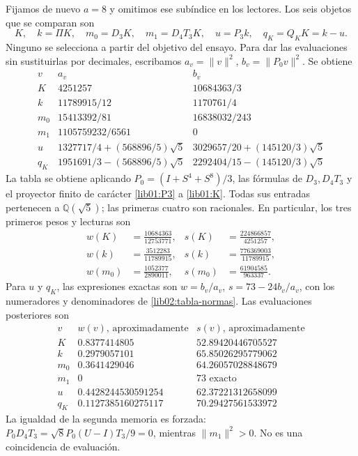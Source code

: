 Fijamos de nuevo \(a=8\) y omitimos ese subíndice en los lectores.
Los seis objetos que se comparan son
\[
 K,\quad k=\Pi K,\quad m_0=D_3K,\quad m_1=D_4T_3K,
 \quad u=P_3k,\quad q_K=Q_KK=k-u.
\]
Ninguno se selecciona a partir del objetivo del ensayo. Para dar las
evaluaciones sin sustituirlas por decimales, escribamos
\(a_v=\|v\|^2\), \(b_v=\|P_0v\|^2\). Se obtiene
\begin{equation}
\begin{array}{c|c|c}
 v&a_v&b_v\\\hline
 K&4251257&10684363/3\\
 k&11789915/12&1170761/4\\
 m_0&15413392/81&16838032/243\\
 m_1&1105759232/6561&0\\
 u&1327717/4+(568896/5)\sqrt5
   &3029657/20+(145120/3)\sqrt5\\
 q_K&1951691/3-(568896/5)\sqrt5
   &2292404/15-(145120/3)\sqrt5
\end{array}
 \label{lib02:tabla-normas}
\end{equation}
La tabla se obtiene aplicando \(P_0=(I+S^4+S^8)/3\), las fórmulas
de \(D_3,D_4T_3\) y el proyector finito de carácter
\eqref{lib01:P3} a \eqref{lib01:K}. Todas sus entradas pertenecen a
\(\mathbb Q(\sqrt5)\); las primeras cuatro son racionales. En
particular, los tres primeros pesos y lecturas son
\begin{align*}
 w(K)&=\frac{10684363}{12753771},&
 s(K)&=\frac{224866857}{4251257},\\
 w(k)&=\frac{3512283}{11789915},&
 s(k)&=\frac{776369003}{11789915},\\
 w(m_0)&=\frac{1052377}{2890011},&
 s(m_0)&=\frac{61904585}{963337}.
\end{align*}
Para \(u\) y \(q_K\), las expresiones exactas son
\(w=b_v/a_v\), \(s=73-24b_v/a_v\), con los numeradores y
denominadores de \eqref{lib02:tabla-normas}. Las evaluaciones posteriores
son
\[
\begin{array}{c|c|c}
 v&w(v)\text{, aproximadamente}&s(v)\text{, aproximadamente}\\\hline
 K&0.8377414805&52.89420446705527\\
 k&0.2979057101&65.85026295779062\\
 m_0&0.3641429046&64.26057028848679\\
 m_1&0&73\text{ exacto}\\
 u&0.4428244530591254&62.37221312658099\\
 q_K&0.1127385160275117&70.29427561533972
\end{array}
\]
La igualdad de la segunda memoria es forzada:
\(P_0D_4T_3=\sqrt8P_0(U-I)T_3/9=0\), mientras
\(\|m_1\|^2>0\). No es una coincidencia de evaluación.

